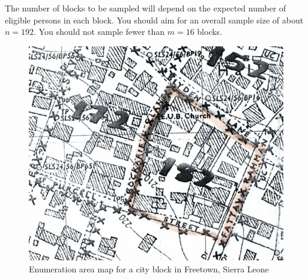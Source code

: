 \documentclass[12pt,a4paper]{book}
\theoremstyle{definition}
\theoremstyle{definition}
\theoremstyle{definition}
\theoremstyle{remark}
\begin{document}
The number of blocks to be sampled will depend on the expected number of
eligible persons in each block. You should aim for an overall sample
size of about \(n = 192\). You should not sample fewer than \(m = 16\)
blocks.

\begin{figure}[H]

{\centering \includegraphics[width=8.38in]{figures/stage2sample11} 

}

\caption{Enumeration area map for a city block in Freetown, Sierra Leone}\label{fig:sample25}
\end{figure}

\newpage
\end{document}
